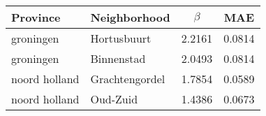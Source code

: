 \begin{tabular}{llcc}
	\toprule
	Province      & Neighborhood   & $\beta$ & MAE    \\
	\midrule
	groningen     & Hortusbuurt    & 2.2161  & 0.0814 \\
	groningen     & Binnenstad     & 2.0493  & 0.0814 \\
	noord holland & Grachtengordel & 1.7854  & 0.0589 \\
	noord holland & Oud-Zuid       & 1.4386  & 0.0673 \\
	\bottomrule
\end{tabular}

